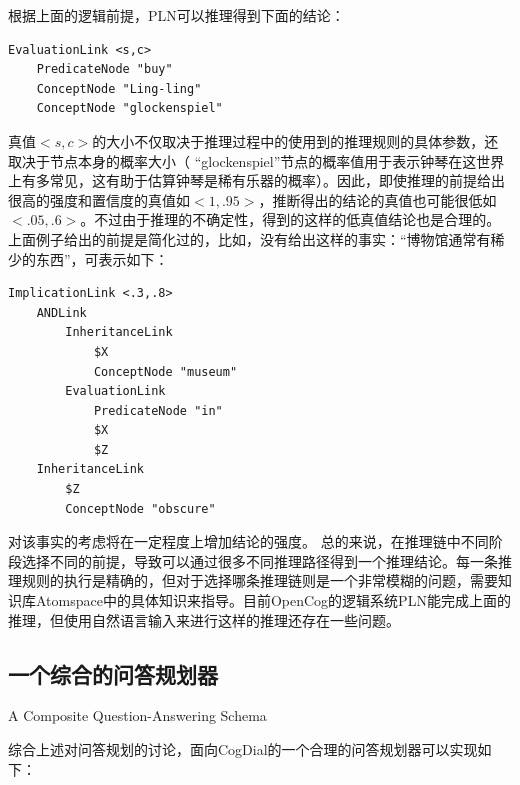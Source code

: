 根据上面的逻辑前提，PLN可以推理得到下面的结论：

\begin{verbatim}
EvaluationLink <s,c>
	PredicateNode "buy"
	ConceptNode "Ling-ling"
	ConceptNode "glockenspiel"
\end{verbatim}

真值$<s,c>$的大小不仅取决于推理过程中的使用到的推理规则的具体参数，还取决于节点本身的概率大小（ “glockenspiel”节点的概率值用于表示钟琴在这世界上有多常见，这有助于估算钟琴是稀有乐器的概率）。因此，即使推理的前提给出很高的强度和置信度的真值如$<1,.95>$，推断得出的结论的真值也可能很低如$<.05,.6>$。不过由于推理的不确定性，得到的这样的低真值结论也是合理的。
上面例子给出的前提是简化过的，比如，没有给出这样的事实：“博物馆通常有稀少的东西”，可表示如下：

\begin{verbatim}
ImplicationLink <.3,.8>
	ANDLink
		InheritanceLink
			$X
			ConceptNode "museum"
		EvaluationLink
			PredicateNode "in"
			$X
			$Z
	InheritanceLink
		$Z
		ConceptNode "obscure"
\end{verbatim}

对该事实的考虑将在一定程度上增加结论的强度。
总的来说，在推理链中不同阶段选择不同的前提，导致可以通过很多不同推理路径得到一个推理结论。每一条推理规则的执行是精确的，但对于选择哪条推理链则是一个非常模糊的问题，需要知识库Atomspace中的具体知识来指导。目前OpenCog的逻辑系统PLN能完成上面的推理，但使用自然语言输入来进行这样的推理还存在一些问题。


\subsection{一个综合的问答规划器}{A Composite Question-Answering Schema}

综合上述对问答规划的讨论，面向CogDial的一个合理的问答规划器可以实现如下：

